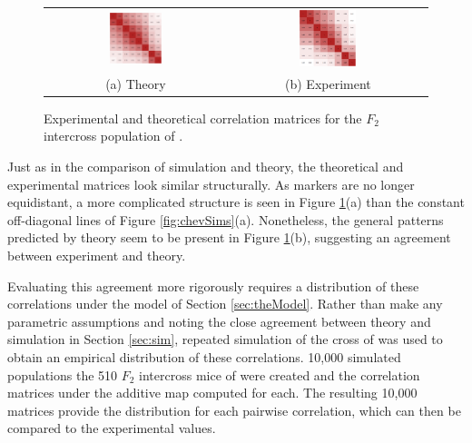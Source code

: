 \documentclass{article}
\begin{document}
\begin{figure}[htp]
  \begin{center}
    \begin{tabular}{cc}
      \includegraphics[width = 0.300\textwidth]{./img/chevCorrTheory.png} &
      \includegraphics[width = 0.300\textwidth]{./img/chevCorr.png} \\
      {\footnotesize (a) Theory} &
      {\footnotesize (b) Experiment} \\
    \end{tabular}
  \end{center}
  \caption{Experimental and theoretical correlation matrices for the $F_2$ intercross population of \cite{cheverudetal2001}.}
  \label{fig:corr2real}
\end{figure}

Just as in the comparison of simulation and theory, the theoretical and experimental matrices look similar structurally. As markers are no longer equidistant, a more complicated structure is seen in Figure \ref{fig:corr2real}(a) than the constant off-diagonal lines of Figure \ref{fig:chevSims}(a). Nonetheless, the general patterns predicted by theory seem to be present in Figure \ref{fig:corr2real}(b), suggesting an agreement between experiment and theory.

Evaluating this agreement more rigorously requires a distribution of these correlations under the model of Section \ref{sec:theModel}. Rather than make any parametric assumptions and noting the close agreement between theory and simulation in Section \ref{sec:sim}, repeated simulation of the cross of \cite{cheverudetal2001} was used to obtain an empirical distribution of these correlations. 10,000 simulated populations the 510 $F_2$ intercross mice of \cite{cheverudetal2001} were created and the correlation matrices under the additive map computed for each. The resulting 10,000 matrices provide the distribution for each pairwise correlation, which can then be compared to the experimental values.
\end{document}
